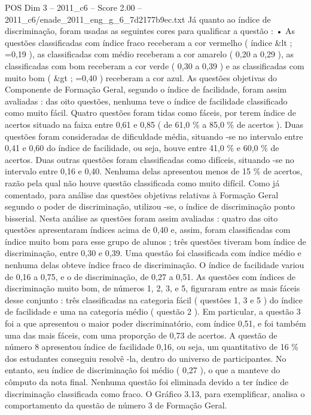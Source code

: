 \begin{textsample}{POS Dim 3 – 2011\_c6 – Score 2.00 – 2011\_c6/enade\_2011\_eng\_g\_6\_7d2177b9ec.txt}
Já quanto ao índice de discriminação, foram usadas as seguintes cores para qualificar a questão : • As questões classificadas com índice fraco receberam a cor vermelho ( índice \&lt ; =0,19 ), as classificadas com médio receberam a cor amarelo ( 0,20 a 0,29 ), as classificadas com bom receberam a cor verde ( 0,30 a 0,39 ) e as classificadas com muito bom ( \&gt ; =0,40 ) receberam a cor azul.
As questões objetivas do Componente de Formação Geral, segundo o índice de facilidade, foram assim avaliadas : das oito questões, nenhuma teve o índice de facilidade classificado como muito fácil.
Quatro questões foram tidas como fáceis, por terem índice de acertos situado na faixa entre 0,61 e 0,85 ( de 61,0 \% a 85,0 \% de acertos ).
Duas questões foram consideradas de dificuldade média, situando -se no intervalo entre 0,41 e 0,60 do índice de facilidade, ou seja, houve entre 41,0 \% e 60,0 \% de acertos.
Duas outras questões foram classificadas como difíceis, situando -se no intervalo entre 0,16 e 0,40.
Nenhuma delas apresentou menos de 15 \% de acertos, razão pela qual não houve questão classificada como muito difícil.
Como já comentado, para análise das questões objetivas relativas à Formação Geral segundo o poder de discriminação, utilizou -se, o índice de discriminação ponto bisserial.
Nesta análise as questões foram assim avaliadas : quatro das oito questões apresentaram índices acima de 0,40 e, assim, foram classificadas com índice muito bom para esse grupo de alunos ; três questões tiveram bom índice de discriminação, entre 0,30 e 0,39.
Uma questão foi classificada com índice médio e nenhuma delas obteve índice fraco de discriminação.
O índice de facilidade variou de 0,16 a 0,75, e o de discriminação, de 0,27 a 0,51.
As questões com índices de discriminação muito bom, de números 1, 2, 3, e 5, figuraram entre as mais fáceis desse conjunto : três classificadas na categoria fácil ( questões 1, 3 e 5 ) do índice de facilidade e uma na categoria médio ( questão 2 ).
Em particular, a questão 3 foi a que apresentou o maior poder discriminatório, com índice 0,51, e foi também uma das mais fáceis, com uma proporção de 0,73 de acertos.
A questão de número 8 apresentou índice de facilidade 0,16, ou seja, um quantitativo de 16 \% dos estudantes conseguiu resolvê -la, dentro do universo de participantes.
No entanto, seu índice de discriminação foi médio ( 0,27 ), o que a manteve do cômputo da nota final.
Nenhuma questão foi eliminada devido a ter índice de discriminação classificada como fraco.
O Gráfico 3.13, para exemplificar, analisa o comportamento da questão de número 3 de Formação Geral.

\end{textsample}
